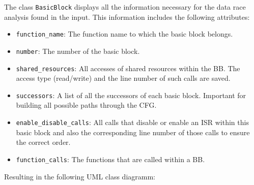 \documentclass[
fancyheadings, %
%
%
]{stsreprt}
\begin{document}
{		The class \texttt{BasicBlock} displays all the information necessary for the data race analysis found in the input. This information includes the following attributes:
		\begin{itemize}
			\item \texttt{function\_name}: The function name to which the basic block belongs.
			\item \texttt{number}: The number of the basic block.
			\item \texttt{shared\_resources}: All accesses of shared resources within the \ac{BB}. The access type (read/write) and the line number of such calls are saved.
			\item \texttt{successors}: A list of all the successors of each basic block. Important for building all possible paths through the CFG.
			\item \texttt{enable\_disable\_calls}: All calls that disable or enable an \ac{ISR} within this basic block and also the corresponding line number of those calls to ensure the correct order.
			\item \texttt{function\_calls}: The functions that are called within a \ac{BB}.
		\end{itemize}
		Resulting in the following UML class diagramm:
		\begin{figure}[H]
			\centering
\end{figure}}
\end{document}
